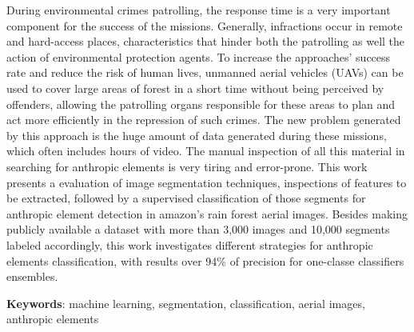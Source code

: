 \begin{resumo}[Abstract]
    During environmental crimes patrolling, the response time is a very important component for the success of the missions. Generally, infractions occur in remote and hard-access places, characteristics that hinder both the patrolling as well the action of environmental protection agents. To increase the approaches' success rate and reduce the risk of human lives, unmanned aerial vehicles (UAVs) can be used to cover large areas of forest in a short time without being perceived by offenders, allowing the patrolling organs responsible for these areas to plan and act more efficiently in the repression of such crimes. The new problem generated by this approach is the huge amount of data generated during these missions, which often includes hours of video. The manual inspection of all this material in searching for anthropic elements is very tiring and error-prone. This work presents a evaluation of image segmentation techniques, inspections of features to be extracted, followed by a supervised classification of those segments for anthropic element detection in amazon's rain forest aerial images. Besides making publicly available a dataset with more than 3,000 images and 10,000 segments labeled accordingly, this work investigates different strategies for anthropic elements classification, with results over 94\% of precision for one-classe classifiers ensembles.

    \vspace{\onelineskip}
    \noindent
    \textbf{Keywords}: machine learning, segmentation, classification, aerial images, anthropic elements
\end{resumo}
